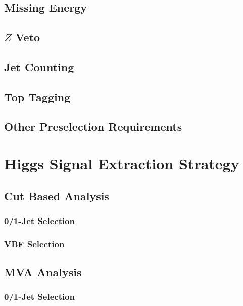 \documentclass{cmspaper}
\begin{document}
   \subsection{Missing Energy} 
     \label{sec:sel_met}
%     
   \subsection{$Z$ Veto}
     \label{sec:sel_zveto}
%     
   \subsection{Jet Counting} 
     \label{sec:sel_jets}
%     
  \subsection{Top Tagging}
     \label{sec:sel_toptag}
%     
   \subsection{Other Preselection Requirements}
     \label{sec:sel_other}
%     

\section{Higgs Signal Extraction Strategy}
%   
   \label{sec:signal_selection}
   \subsection{Cut Based Analysis}
     \label{sec:anal_cutbased}
    \subsubsection{0/1-Jet Selection}
      \label{sec:sel_zerojet}
%      
     \subsubsection{VBF Selection}
       \label{sec:sel_vbf}
%       
   \subsection{MVA Analysis}
     \label{sec:anal_mva}
%     
     \subsubsection{0/1-Jet Selection}
       \label{sec:sel_mva_zero_one_jet}
\end{document}
